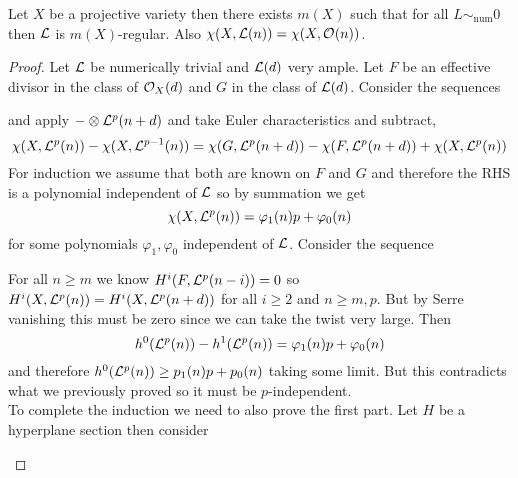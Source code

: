 \documentclass[12pt]{article}
\begin{document}
\begin{prop}
Let $X$ be a projective variety then there exists $m(X)$ such that for all $L \sim_{\text{num}} 0$ then $\mathcal{L}$ is $m(X)$-regular. Also $\chi(X, \mathcal{L}(n)) = \chi(X, \mathcal{O}_{}(n))$. 
\end{prop}

\begin{proof}
Let $\mathcal{L}$ be numerically trivial and $\mathcal{L}(d)$ very ample. Let $F$ be an effective divisor in the class of $\mathcal{O}_{X}(d)$ and $G$ in the class of $\mathcal{L}(d)$. Consider the sequences
\begin{center}
\end{center}
and apply $- \otimes \mathcal{L}^{p}(n+d)$ and take Euler characteristics and subtract,
\[ \chi(X, \mathcal{L}^p(n)) - \chi(X, \mathcal{L}^{p-1}(n)) = \chi(G, \mathcal{L}^p(n+d)) - \chi(F, \mathcal{L}^p(n+d)) + \chi(X, \mathcal{L}^p(n))  \]
For induction we assume that both are known on $F$ and $G$ and therefore the RHS is a polynomial independent of $\mathcal{L}$ so by summation we get
\[ \chi(X, \mathcal{L}^p(n)) = \varphi_1(n) p + \varphi_0(n) \]
for some polynomials $\varphi_1, \varphi_0$ independent of $\mathcal{L}$.
Consider the sequence
\begin{center}
\end{center}
For all $n \ge m$ we know $H^i(F, \mathcal{L}^p(n-i)) = 0$ so $H^i(X, \mathcal{L}^p(n)) = H^i(X, \mathcal{L}^p(n+d))$ for all $i \ge 2$ and $n \ge m, p$. But by Serre vanishing this must be zero since we can take the twist very large. Then
\[ h^0(\mathcal{L}^p(n)) - h^1(\mathcal{L}^p(n)) = \varphi_1(n) p + \varphi_0(n) \]
and therefore $h^0(\mathcal{L}^p(n)) \ge p_1(n) p + p_0(n)$ taking some limit. But this contradicts what we previously proved so it must be $p$-independent.
\bigskip\\
To complete the induction we need to also prove the first part. Let $H$ be a hyperplane section then consider
\begin{center}
\end{center}

\end{proof}
\end{document}
